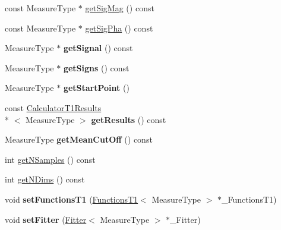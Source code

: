 \begin{DoxyCompactItemize}
\item 
const Measure\-Type $\ast$ \hyperlink{class_ox_1_1_calculator_t1_a7a8fbda407b35212f781640e7cee9f2c}{get\-Sig\-Mag} () const 
\item 
const Measure\-Type $\ast$ \hyperlink{class_ox_1_1_calculator_t1_a1208138a5257482a5f3acc308f3bfd5a}{get\-Sig\-Pha} () const 
\item 
\hypertarget{class_ox_1_1_calculator_t1_a7048aabe616f4ab4b0746d07b38acfa5}{Measure\-Type $\ast$ {\bfseries get\-Signal} () const }\label{class_ox_1_1_calculator_t1_a7048aabe616f4ab4b0746d07b38acfa5}

\item 
\hypertarget{class_ox_1_1_calculator_t1_a1fb7d7a8ab324b807447a5757d8e20f9}{Measure\-Type $\ast$ {\bfseries get\-Signs} () const }\label{class_ox_1_1_calculator_t1_a1fb7d7a8ab324b807447a5757d8e20f9}

\item 
\hypertarget{class_ox_1_1_calculator_t1_a4d430a63b313f8ae1197a27842e87d47}{Measure\-Type $\ast$ {\bfseries get\-Start\-Point} ()}\label{class_ox_1_1_calculator_t1_a4d430a63b313f8ae1197a27842e87d47}

\item 
\hypertarget{class_ox_1_1_calculator_t1_a55406cd104fb7d67925ece789161e2c9}{const \hyperlink{struct_ox_1_1_calculator_t1_results}{Calculator\-T1\-Results}\\*
$<$ Measure\-Type $>$ {\bfseries get\-Results} () const }\label{class_ox_1_1_calculator_t1_a55406cd104fb7d67925ece789161e2c9}

\item 
\hypertarget{class_ox_1_1_calculator_t1_a3b66db06485b8031bcface5524d8c081}{Measure\-Type {\bfseries get\-Mean\-Cut\-Off} () const }\label{class_ox_1_1_calculator_t1_a3b66db06485b8031bcface5524d8c081}

\item 
int \hyperlink{class_ox_1_1_calculator_t1_a8a11b3b6c0dcbc461c11dc55600d7992}{get\-N\-Samples} () const 
\item 
int \hyperlink{class_ox_1_1_calculator_t1_a7523942a79b9ee44b2b5d81d5836b54d}{get\-N\-Dims} () const 
\item 
\hypertarget{class_ox_1_1_calculator_t1_a88e23f6ffa2903dc14a6133a90203f02}{void {\bfseries set\-Functions\-T1} (\hyperlink{class_ox_1_1_functions_t1}{Functions\-T1}$<$ Measure\-Type $>$ $\ast$\-\_\-\-Functions\-T1)}\label{class_ox_1_1_calculator_t1_a88e23f6ffa2903dc14a6133a90203f02}

\item 
\hypertarget{class_ox_1_1_calculator_t1_a106746ffcc08288c933c4dc210589f35}{void {\bfseries set\-Fitter} (\hyperlink{class_ox_1_1_fitter}{Fitter}$<$ Measure\-Type $>$ $\ast$\-\_\-\-Fitter)}\label{class_ox_1_1_calculator_t1_a106746ffcc08288c933c4dc210589f35}


\end{DoxyCompactItemize}
